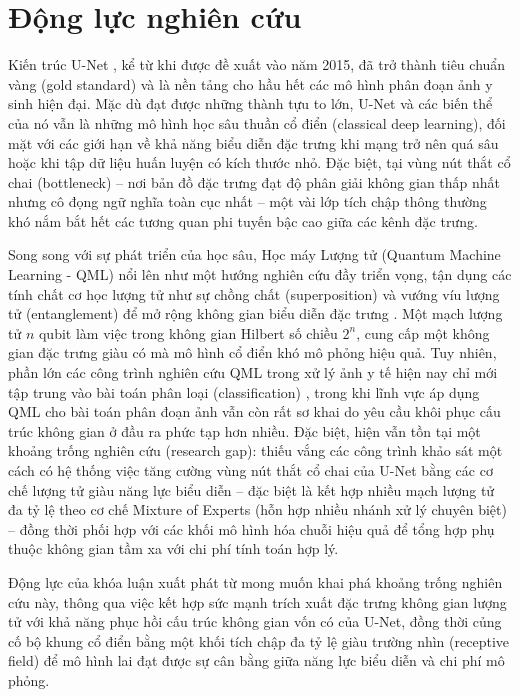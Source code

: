 \section{Động lực nghiên cứu}
Kiến trúc U-Net \cite{ronneberger2015unet}, kể từ khi được đề xuất vào năm 2015, đã trở thành tiêu chuẩn vàng (gold standard) và là nền tảng cho hầu hết các mô hình phân đoạn ảnh y sinh hiện đại. Mặc dù đạt được những thành tựu to lớn, U-Net và các biến thể của nó vẫn là những mô hình học sâu thuần cổ điển (classical deep learning), đối mặt với các giới hạn về khả năng biểu diễn đặc trưng khi mạng trở nên quá sâu hoặc khi tập dữ liệu huấn luyện có kích thước nhỏ. Đặc biệt, tại vùng nút thắt cổ chai (bottleneck) -- nơi bản đồ đặc trưng đạt độ phân giải không gian thấp nhất nhưng cô đọng ngữ nghĩa toàn cục nhất -- một vài lớp tích chập thông thường khó nắm bắt hết các tương quan phi tuyến bậc cao giữa các kênh đặc trưng.

Song song với sự phát triển của học sâu, Học máy Lượng tử (Quantum Machine Learning - QML) nổi lên như một hướng nghiên cứu đầy triển vọng, tận dụng các tính chất cơ học lượng tử như sự chồng chất (superposition) và vướng víu lượng tử (entanglement) để mở rộng không gian biểu diễn đặc trưng \cite{biamonte2017qml}. Một mạch lượng tử $n$ qubit làm việc trong không gian Hilbert số chiều $2^{n}$, cung cấp một không gian đặc trưng giàu có mà mô hình cổ điển khó mô phỏng hiệu quả. Tuy nhiên, phần lớn các công trình nghiên cứu QML trong xử lý ảnh y tế hiện nay chỉ mới tập trung vào bài toán phân loại (classification) \cite{shahjalal2025hqcnn}, trong khi lĩnh vực áp dụng QML cho bài toán phân đoạn ảnh vẫn còn rất sơ khai do yêu cầu khôi phục cấu trúc không gian ở đầu ra phức tạp hơn nhiều. Đặc biệt, hiện vẫn tồn tại một khoảng trống nghiên cứu (research gap): thiếu vắng các công trình khảo sát một cách có hệ thống việc tăng cường vùng nút thắt cổ chai của U-Net bằng các cơ chế lượng tử giàu năng lực biểu diễn -- đặc biệt là kết hợp nhiều mạch lượng tử đa tỷ lệ theo cơ chế Mixture of Experts (hỗn hợp nhiều nhánh xử lý chuyên biệt) -- đồng thời phối hợp với các khối mô hình hóa chuỗi hiệu quả để tổng hợp phụ thuộc không gian tầm xa với chi phí tính toán hợp lý.

Động lực của khóa luận xuất phát từ mong muốn khai phá khoảng trống nghiên cứu này, thông qua việc kết hợp sức mạnh trích xuất đặc trưng không gian lượng tử với khả năng phục hồi cấu trúc không gian vốn có của U-Net, đồng thời củng cố bộ khung cổ điển bằng một khối tích chập đa tỷ lệ giàu trường nhìn (receptive field) để mô hình lai đạt được sự cân bằng giữa năng lực biểu diễn và chi phí mô phỏng.

